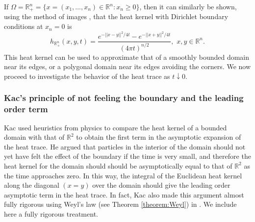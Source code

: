 \documentclass{amsart}
\theoremstyle{definition}
\newcommand*{\R}{\mathbb{R}}
\begin{document}
If $\Omega = \R_+^n = \{x = (x_1,\dots,x_n) \in \R^n : x_n \geq 0\}$, %
then it can similarly be shown, using the method of images \cite{gaponenko1969method}, that the heat kernel with Dirichlet boundary conditions at $x_n = 0$ is
\begin{equation} \label{eq:heatkernel_halfspace}
    h_{\R_+^n}(x,y,t) = \frac{e^{-||x-y||^2/4t} - e^{-||x+y||^2/4t}}{(4\pi t)^{n/2}}, \,\, x,y \in \R^n.
\end{equation}
This heat kernel can be used to approximate that of a smoothly bounded domain near its edges, or a polygonal domain near its edges avoiding the corners.  We now proceed to investigate the behavior of the heat trace as $t \downarrow 0$.

\subsubsection{Kac's principle of not feeling the boundary and the leading order term} \label{sec:t^-1rigorous}
Kac used heuristics from physics to compare the heat kernel of a bounded domain with that of $\R^2$ to obtain the first term in the asymptotic expansion of the heat trace. He argued that particles in the interior of the domain should not yet have felt the effect of the boundary if the time is very small, and therefore the heat kernel for the domain should should be asymptotically equal to that of $\R^2$ as the time approaches zero. In this way, the integral of the Euclidean heat kernel along the diagonal $(x=y)$ over the domain should give the leading order asymptotic term in the heat trace. In fact, Kac also made this argument almost fully rigorous using Weyl's law (see Theorem \ref{theorem:Weyl}) in \cite[\S 8]{kac1966can}.  We include here a fully rigorous treatment.
\end{document}
